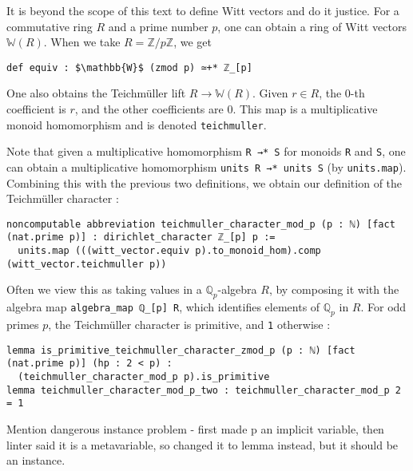 \documentclass[a4paper,UKenglish,cleveref, autoref, thm-restate]{lipics-v2021}
\newcommand{\lean}[1]{\texttt{#1}\xspace} %
\begin{document}
It is beyond the scope of this text to define Witt vectors and do it justice. For a commutative ring
$R$ and a prime number $p$, one can obtain a ring of Witt vectors $\mathbb{W}(R)$.
When we take $R = \mathbb{Z}/p \mathbb{Z}$, we get 
\begin{lstlisting}
def equiv : $\mathbb{W}$ (zmod p) ≃+* ℤ_[p]
\end{lstlisting}
One also obtains the Teichmüller lift $R \to \mathbb{W} (R)$. Given $r \in R$, 
the 0-th coefficient is $r$, and the other coefficients are 0. This map is a 
multiplicative monoid homomorphism and is denoted \lean{teichmuller}. 

Note that given a multiplicative homomorphism \lean{R →* S} for monoids \lean{R} 
and \lean{S}, one can obtain a multiplicative homomorphism \lean{units R →* units S} 
(by \lean{units.map}). Combining this with the previous two 
definitions, we obtain our definition of the Teichmüller character : 
\begin{lstlisting}
noncomputable abbreviation teichmuller_character_mod_p (p : ℕ) [fact (nat.prime p)] : dirichlet_character ℤ_[p] p :=
  units.map (((witt_vector.equiv p).to_monoid_hom).comp (witt_vector.teichmuller p))
\end{lstlisting}
Often we view this as taking values in a $\mathbb{Q}_p$-algebra $R$, by composing it 
with the algebra map \lean{algebra\_map ℚ\_[p] R}, which identifies elements of $\mathbb{Q}_p$ 
in $R$. \newline
For odd primes $p$, the Teichmüller character is primitive, and \lean{1} otherwise : 
\begin{lstlisting}
lemma is_primitive_teichmuller_character_zmod_p (p : ℕ) [fact (nat.prime p)] (hp : 2 < p) : 
  (teichmuller_character_mod_p p).is_primitive
lemma teichmuller_character_mod_p_two : teichmuller_character_mod_p 2 = 1
\end{lstlisting}
 Mention dangerous instance problem - first made p an implicit variable, then linter said it is a metavariable, so changed it to lemma instead, but it should be an instance.
 
\end{document}
